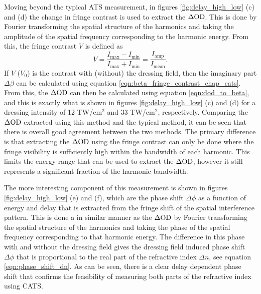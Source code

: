 Moving beyond the typical ATS measurement, in figures \ref{fig:delay_high_low} (c) and (d) the change in fringe contrast is used to extract the $\Delta\mathrm{OD}$.  This is done by Fourier transforming the spatial structure of the harmonics and taking the amplitude of the spatial frequency corresponding to the harmonic energy.  From this, the fringe contrast $V$ is defined as
\begin{equation}
	V=\frac{I_{\mathrm{max}} - I_{\mathrm{min}}}{I_{\mathrm{max}} + I_{\mathrm{min}}} = \frac{I_{\mathrm{amp}}}{I_{\mathrm{mean}}}.
\end{equation}
If $V$ ($V_0$) is the contrast with (without) the dressing field, then the imaginary part $\Delta\beta$ can be calculated using equation \ref{eqn:beta_fringe_contrast_chap_cats}.  From this, the $\Delta\mathrm{OD}$ can then be calculated using equation \ref{eqn:dod_to_beta}, and this is exactly what is shown in figures \ref{fig:delay_high_low} (c) and (d) for a dressing intensity of 12 TW/cm$^2$ and 33 TW/cm$^2$, respectively.  Comparing the $\Delta\mathrm{OD}$ extracted using this method and the typical method, it can be seen that there is overall good agreement between the two methods.  The primary difference is that extracting the $\Delta\mathrm{OD}$ using the fringe contrast can only be done where the fringe visibility is sufficiently high within the bandwidth of each harmonic.  This limits the energy range that can be used to extract the $\Delta\mathrm{OD}$, however it still represents a significant fraction of the harmonic bandwidth.

The more interesting component of this measurement is shown in figures \ref{fig:delay_high_low} (e) and (f), which are the phase shift $\Delta\phi$ as a function of energy and delay that is extracted from the fringe shift of the spatial interference pattern.  This is done a in similar manner as the $\Delta\mathrm{OD}$ by Fourier transforming the spatial structure of the harmonics and taking the phase of the spatial frequency corresponding to that harmonic energy.  The difference in this phase with and without the dressing field gives the dressing field induced phase shift $\Delta\phi$ that is proportional to the real part of the refractive index $\Delta n$, see equation \ref{eqn:phase_shift_dn}.  As can be seen, there is a clear delay dependent phase shift that confirms the feasibility of measuring both parts of the refractive index using CATS. 

